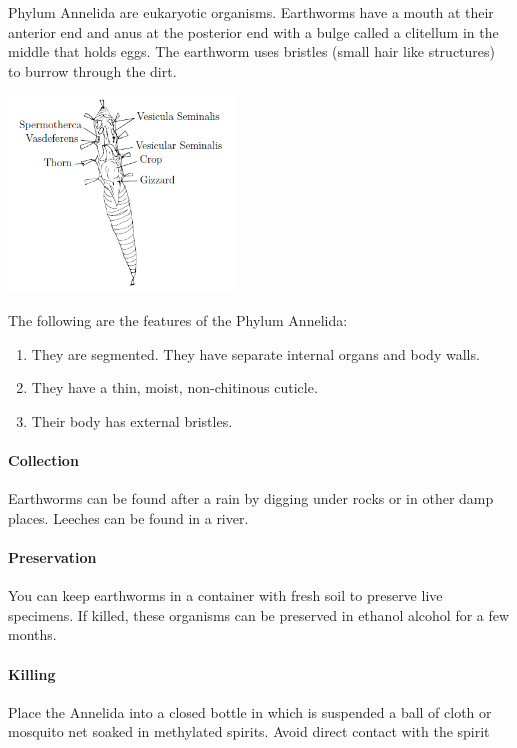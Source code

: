\begin{multicols}{2}
Phylum Annelida are eukaryotic organisms. Earthworms have a mouth at their anterior end and anus at the posterior end with a bulge called a clitellum in the middle that holds eggs. The earthworm uses bristles (small hair like structures) to burrow through the dirt. 

\columnbreak

\begin{center}
\includegraphics[width=0.45\textwidth]{./img/earthworm.png}
\end{center}

The following are the features of the Phylum Annelida:

\begin{enumerate}
\item{They are segmented. They have separate internal organs and body walls.}
\item{They have a thin, moist, non-chitinous cuticle.}
\item{Their body has external bristles.}
\end{enumerate}

\paragraph{Collection}
Earthworms can be found after a rain by digging under rocks or in other damp places. Leeches can be found in a river.

\paragraph{Preservation} 
You can keep earthworms in a container with fresh soil to preserve live specimens. If killed, these organisms can be preserved in ethanol alcohol for a few months. 

\paragraph{Killing}
Place the Annelida into a closed bottle in which is suspended a ball of cloth or mosquito net soaked in methylated spirits. Avoid direct contact with the spirit


\end{multicols}
